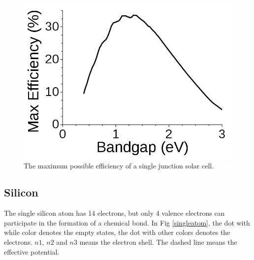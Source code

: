 \documentclass[a4paper, 12pt, titlepage,oneside,drop]{kthesis}
\begin{document}
\begin{figure}[H]
\centering
\includegraphics[scale=.25]{maxgap.png}
\caption{The maximum possible efficiency of a single junction solar cell.}
\label{maxgap}
\end{figure}

\subsection{Silicon} 
The single silicon atom has 14 electrons, but only 4 valence electrons can participate in the formation of a chemical bond. In Fig \ref{singleatom}, the dot with while color denotes the empty states, 
the dot with other colors denotes the electrons. $n1$, $n2$ and $n3$ means the electron shell. The dashed line means the effective potential.
\end{document}
